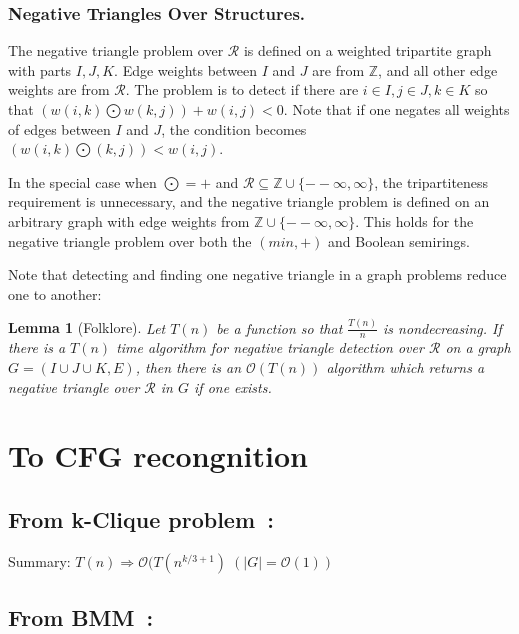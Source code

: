\documentclass{amsart}
\newtheorem*{lemma}{Lemma}
\begin{document}
	\subsubsection{Negative Triangles Over Structures.}
	
	The negative triangle problem over $\mathcal{R}$ is defined on a weighted tripartite graph with parts $I, J, K$. Edge weights between $I$ and $J$ are from $\mathbb{Z}$, and all other edge weights are from
	$\mathcal{R}$. The problem is to detect if there are $i \in I, j \in J, k \in K$ so that $(w(i, k) \bigodot w(k, j)) + w(i, j) < 0$. Note that if one negates all weights of edges between $I$ and $J$, the condition becomes $(w(i, k) \bigodot(k, j)) < w(i, j)$.
	
	In the special case when $\bigodot = +$ and $\mathcal{R} \subseteq \mathbb{Z} \cup \{ -- \infty, \infty\}$, the tripartiteness requirement is unnecessary, and the negative triangle problem is defined on an arbitrary graph with edge weights from $\mathbb{Z} \cup \{ -- \infty, \infty\}$. This
	holds for the negative triangle problem over both the $(min, +)$ and Boolean semirings.
	
	Note that detecting and finding one negative triangle in a graph problems reduce one to another:
	
	\begin{lemma}[Folklore]
		Let $T(n)$ be a function so that $\frac{T(n)}{n}$ is nondecreasing. If there is a $T(n)$ time
		algorithm for negative triangle detection over $\mathcal{R}$ on a graph $G = (I \cup J \cup K, E)$, then there is an $\mathcal{O}(T(n))$ algorithm which returns a negative triangle over $\mathcal{R}$ in $G$ if one exists.
	\end{lemma}
	
	\section{To CFG recongnition}
	
	\subsection{From k-Clique problem~\cite{abboud2018if}:\\}
	\label{cfg_to_clique}
	
	Summary: $T(n) \Rightarrow \mathcal{O}(T(n^{k/3+1}) \; (|G|=\mathcal{O}(1))$
	
	\subsection{From BMM~\cite{10.1145/505241.505242}:\\}
	\label{cfg_to_bmm}
	
\end{document}
